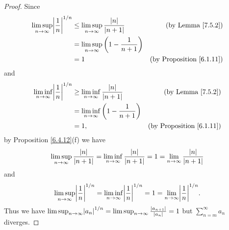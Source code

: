 \begin{proof}
    Since
    \begin{align*}
        \limsup_{n \to \infty} \abs{\frac{1}{n}}^{1 / n} & \leq \limsup_{n \to \infty} \frac{\abs{n}}{\abs{n + 1}}  & \text{(by Lemma \ref{7.5.2})}        \\
                                                         & = \limsup_{n \to \infty} \bigg(1 - \frac{1}{n + 1}\bigg)                                        \\
                                                         & = 1                                                      & \text{(by Proposition \ref{6.1.11})}
    \end{align*}
    and
    \begin{align*}
        \liminf_{n \to \infty} \abs{\frac{1}{n}}^{1 / n} & \geq \liminf_{n \to \infty} \frac{\abs{n}}{\abs{n + 1}}  & \text{(by Lemma \ref{7.5.2})}        \\
                                                         & = \liminf_{n \to \infty} \bigg(1 - \frac{1}{n + 1}\bigg)                                        \\
                                                         & = 1,                                                     & \text{(by Proposition \ref{6.1.11})}
    \end{align*}
    by Proposition \ref{6.4.12}(f) we have
    \[
        \limsup_{n \to \infty} \frac{\left\lvert n\right\rvert}{\left\lvert n + 1\right\rvert} = \liminf_{n \to \infty} \frac{\left\lvert n\right\rvert}{\left\lvert n + 1\right\rvert} = 1 = \lim_{n \to \infty} \frac{\left\lvert n\right\rvert}{\left\lvert n + 1\right\rvert}
    \]
    and
    \[
        \limsup_{n \to \infty} \abs{\frac{1}{n}}^{1 / n} = \liminf_{n \to \infty} \abs{\frac{1}{n}}^{1 / n} = 1 = \lim_{n \to \infty} \abs{\frac{1}{n}}^{1 / n}.
    \]
    Thus we have \(\limsup_{n \to \infty} \abs{a_n}^{1 / n} = \limsup_{n \to \infty} \frac{\abs{a_{n + 1}}}{\abs{a_n}} = 1\) but \(\sum_{n = m}^\infty a_n\) diverges.


\end{proof}
